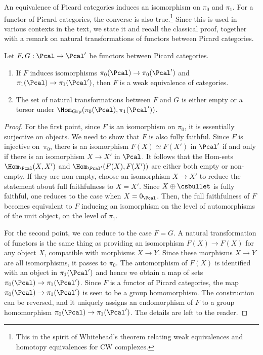 An equivalence of Picard categories induces an isomorphism on $\pi_0$ and $\pi_1$. For a functor of Picard categories, the converse is also true.\footnote{This in the spirit of Whitehead's theorem relating weak equivalences and homotopy equivalences for CW complexes.} Since this is used in various contexts in the text, we state it and recall the classical proof, together with a remark on natural transformations of functors between Picard categories.
\begin{lemma}\label{lemma:isoPicard}
Let $F, G: \Pcal \to \Pcal'$ be functors between Picard categories.
\begin{enumerate}
\item If $F$ induces isomorphisms $\pi_0(\Pcal) \to \pi_0(\Pcal')$ and $\pi_1(\Pcal) \to \pi_1(\Pcal')$, then $F$ is a weak equivalence of categories.
\item The set of natural transformations between $F$ and $G$ is either empty or a torsor under $\Hom_{\mathrm{Grp}}(\pi_0(\Pcal), \pi_1(\Pcal'))$.
\end{enumerate}
\end{lemma}
\begin{proof}
For the first point, since $F$ is an isomorphism on $\pi_0$, it is essentially surjective on objects. We need to show that $F$ is also fully faithful. Since $F$ is injective on~$\pi_0$, there is an isomorphism $F(X) \simeq F(X')$ in $\Pcal'$ if and only if there is an isomorphism $X\to X'$ in $\Pcal$. It follows that the Hom-sets $\Hom_{\Pcal}(X,X')$ and $\Hom_{\Pcal'}(F(X), F(X'))$ are either both empty or non-empty. If they are non-empty, choose an isomorphism $X\to X'$ to reduce the statement about full faithfulness to $X=X'$. Since $X\oplus \csbullet$ is fully faithful, one reduces to the case when $X = 0_{\Pcal}$. Then, the full faithfulness of $F$ becomes equivalent to $F$ inducing an isomorphism on the level of automorphisms of the unit object, \ie on the level of $\pi_1$.

For the second point, we can reduce to the case $F=G$. A natural transformation of functors is the same thing as providing an isomorphism $F(X) \to F(X)$ for any object $X$, compatible with morphisms $X\to Y$. Since these morphisms $X\to Y$ are all isomorphisms, it passes to $\pi_0$. The automorphism of $F(X)$ is identified with an object in $\pi_1(\Pcal')$ and hence we obtain a map of sets $\pi_0(\Pcal) \to \pi_1(\Pcal')$. Since $F$ is a functor of Picard categories, the map $\pi_0(\Pcal) \to \pi_1(\Pcal')$ is seen to be a group homomorphism. The construction can be reversed, and it uniquely assigns an endomorphism of $F$ to a group homomorphism $\pi_0(\Pcal) \to \pi_1(\Pcal')$. The details are left to the reader.
\end{proof}

